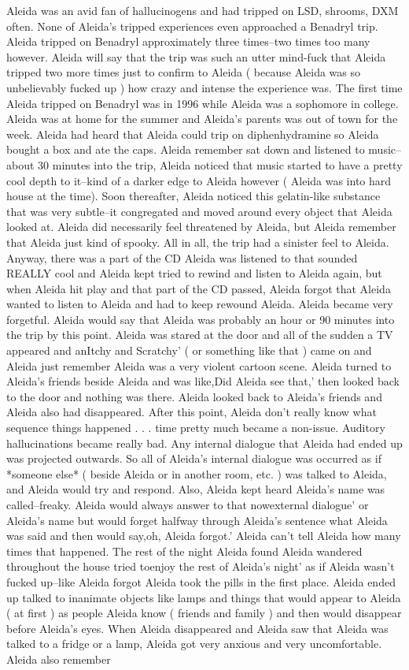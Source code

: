 \documentclass[12pt]{book}
\begin{document}
Aleida was an avid fan of hallucinogens and had tripped on LSD, shrooms, DXM often. None of Aleida's tripped experiences even approached a Benadryl trip. Aleida tripped on Benadryl approximately three times--two times too many however. Aleida will say that the trip was such an utter mind-fuck that Aleida tripped two more times just to confirm to Aleida ( because Aleida was so unbelievably fucked up ) how crazy and intense the experience was. The first time Aleida tripped on Benadryl was in 1996 while Aleida was a sophomore in college. Aleida was at home for the summer and Aleida's parents was out of town for the week. Aleida had heard that Aleida could trip on diphenhydramine so Aleida bought a box and ate the caps. Aleida remember sat down and listened to music--about 30 minutes into the trip, Aleida noticed that music started to have a pretty cool depth to it--kind of a darker edge to Aleida however ( Aleida was into hard house at the time). Soon thereafter, Aleida noticed this gelatin-like substance that was very subtle--it congregated and moved around every object that Aleida looked at. Aleida did necessarily feel threatened by Aleida, but Aleida remember that Aleida just kind of spooky. All in all, the trip had a sinister feel to Aleida. Anyway, there was a part of the CD Aleida was listened to that sounded REALLY cool and Aleida kept tried to rewind and listen to Aleida again, but when Aleida hit play and that part of the CD passed, Aleida forgot that Aleida wanted to listen to Aleida and had to keep rewound Aleida. Aleida became very forgetful. Aleida would say that Aleida was probably an hour or 90 minutes into the trip by this point. Aleida was stared at the door and all of the sudden a TV appeared and anItchy and Scratchy' ( or something like that ) came on and Aleida just remember Aleida was a very violent cartoon scene. Aleida turned to Aleida's friends beside Aleida and was like,Did Aleida see that,' then looked back to the door and nothing was there. Aleida looked back to Aleida's friends and Aleida also had disappeared. After this point, Aleida don't really know what sequence things happened . . .  time pretty much became a non-issue. Auditory hallucinations became really bad. Any internal dialogue that Aleida had ended up was projected outwards. So all of Aleida's internal dialogue was occurred as if *someone else* ( beside Aleida or in another room, etc. ) was talked to Aleida, and Aleida would try and respond. Also, Aleida kept heard Aleida's name was called--freaky. Aleida would always answer to that nowexternal dialogue' or Aleida's name but would forget halfway through Aleida's sentence what Aleida was said and then would say,oh, Aleida forgot.' Aleida can't tell Aleida how many times that happened. The rest of the night Aleida found Aleida wandered throughout the house tried toenjoy the rest of Aleida's night' as if Aleida wasn't fucked up--like Aleida forgot Aleida took the pills in the first place. Aleida ended up talked to inanimate objects like lamps and things that would appear to Aleida ( at first ) as people Aleida know ( friends and family ) and then would disappear before Aleida's eyes. When Aleida disappeared and Aleida saw that Aleida was talked to a fridge or a lamp, Aleida got very anxious and very uncomfortable. Aleida also remember 
\end{document}
